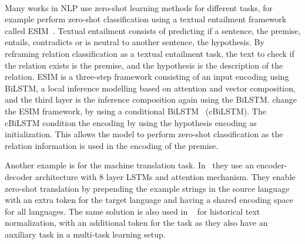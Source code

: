 \paragraph{}
Many works in NLP use zero-shot learning methods for different tasks, for example 
\cite{obamuyide-vlachos-2018-zero} perform zero-shot classification using a textual entailment framework called ESIM~\citep{chen-etal-2017-enhanced}. Textual entailment consists of predicting if a sentence, the premise, entails, contradicts or is neutral to another sentence, the hypothesis. By reframing relation classification as a textual entailment task, the text to check if the relation exists is the premise, and the hypothesis is the description of the relation. ESIM is a three-step framework consisting of an input encoding using BiLSTM, a local inference modelling based on attention and vector composition, and the third layer is the inference composition again using the BiLSTM. \cite{obamuyide-vlachos-2018-zero} change the ESIM framework, by using a conditional BiLSTM~\citep{rocktaschel2015reasoning} (cBiLSTM). The cBiLSTM condition the encoding by using the hypothesis encoding as initialization. This allows the model to perform zero-shot classification as the relation information is used in the encoding of the premise.

Another example is for the machine translation task. In~\citep{johnson-etal-2017-googles} they use an encoder-decoder architecture with 8 layer LSTMs and attention mechanism. They enable zero-shot translation by prepending the example strings in the source language with an extra token for the target language and having a shared encoding space for all languages. The same solution is also used in ~\citep{bollmann2019zero} for historical text normalization, with an additional token for the task as they also have an auxiliary task in a multi-task learning setup. 
